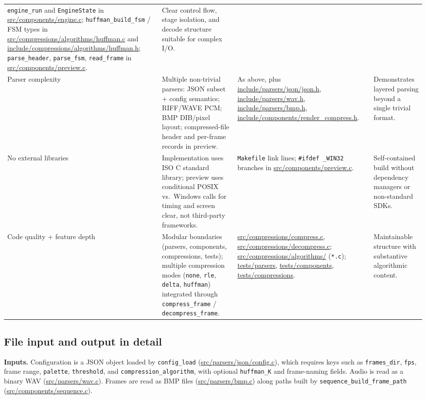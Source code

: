 \begin{table}[H]
\begin{tabularx}{\textwidth}{@{} >{\raggedright\arraybackslash}p{2.2cm} >{\raggedright\arraybackslash\hsize=0.85\hsize}X >{\raggedright\arraybackslash\hsize=1.35\hsize}X >{\raggedright\arraybackslash\hsize=0.80\hsize}X @{}}
        \texttt{engine\_run} and \texttt{EngineState} in \url{src/components/engine.c}; \texttt{huffman\_build\_fsm} / FSM types in \url{src/compressions/algorithms/huffman.c} and \url{include/compressions/algorithms/huffman.h}; \texttt{parse\_header}, \texttt{parse\_fsm}, \texttt{read\_frame} in \url{src/components/preview.c}. &
        Clear control flow, stage isolation, and decode structure suitable for complex I/O. \\
        \addlinespace
        Parser complexity &
        Multiple non-trivial parsers: JSON subset + config semantics; RIFF/WAVE PCM; BMP DIB/pixel layout; compressed-file header and per-frame records in preview. &
        As above, plus \url{include/parsers/json/json.h}, \url{include/parsers/wav.h}, \url{include/parsers/bmp.h}, \url{include/components/render_compress.h}. &
        Demonstrates layered parsing beyond a single trivial format. \\
        \addlinespace
        No external libraries &
        Implementation uses ISO C standard library; preview uses conditional POSIX vs.\ Windows calls for timing and screen clear, not third-party frameworks. &
        \texttt{Makefile} link lines; \texttt{\#ifdef \_WIN32} branches in \url{src/components/preview.c}. &
        Self-contained build without dependency managers or non-standard SDKs. \\
        \addlinespace
        Code quality + feature depth &
        Modular boundaries (parsers, components, compressions, tests); multiple compression modes (\texttt{none}, \texttt{rle}, \texttt{delta}, \texttt{huffman}) integrated through \texttt{compress\_frame} / \texttt{decompress\_frame}. &
        \url{src/compressions/compress.c}, \url{src/compressions/decompress.c}; \url{src/compressions/algorithms/} (\texttt{*.c}); \url{tests/parsers}, \url{tests/components}, \url{tests/compressions}. &
        Maintainable structure with substantive algorithmic content. \\
        \bottomrule
    \end{tabularx}
    \endgroup
\end{table}

\subsection{File input and output in detail}
\textbf{Inputs.} Configuration is a JSON object loaded by \texttt{config\_load} (\url{src/parsers/json/config.c}), which requires keys such as \texttt{frames\_dir}, \texttt{fps}, frame range, \texttt{palette}, \texttt{threshold}, and \texttt{compression\_algorithm}, with optional \texttt{huffman\_K} and frame-naming fields. Audio is read as a binary WAV (\url{src/parsers/wav.c}). Frames are read as BMP files (\url{src/parsers/bmp.c}) along paths built by \texttt{sequence\_build\_frame\_path} (\url{src/components/sequence.c}).

